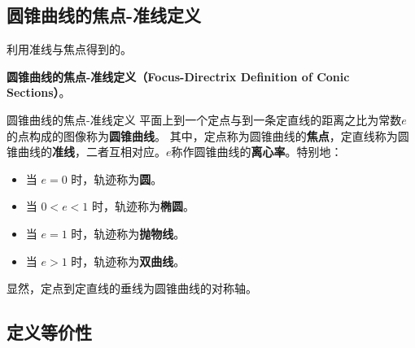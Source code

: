 

\subsection{圆锥曲线的焦点-准线定义}

利用准线与焦点得到的。

\textbf{圆锥曲线的焦点-准线定义（Focus-Directrix Definition of Conic Sections）}。

\begin{definition}{圆锥曲线的焦点-准线定义}
平面上到一个定点与到一条定直线的距离之比为常数$e$的点构成的图像称为\textbf{圆锥曲线}。
其中，定点称为圆锥曲线的\textbf{焦点}，定直线称为圆锥曲线的\textbf{准线}，二者互相对应。$e$称作圆锥曲线的\textbf{离心率}。特别地：
\begin{itemize}
\item 当 $e =0$ 时，轨迹称为\textbf{圆}。
\item 当 $0 < e < 1$ 时，轨迹称为\textbf{椭圆}。
\item 当 $e =1$ 时，轨迹称为\textbf{抛物线}。
\item 当 $e > 1$ 时，轨迹称为\textbf{双曲线}。
\end{itemize}
\end{definition}

显然，定点到定直线的垂线为圆锥曲线的对称轴。

\subsection{定义等价性}
